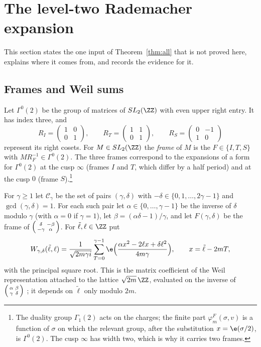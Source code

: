 \section{The level-two Rademacher expansion}\label{sec:hypothesis}

This section states the one input of Theorem~\ref{thm:all} that is not proved here, explains where it comes from, and records the evidence for it.

\subsection{Frames and Weil sums}
Let $\Gamma^0(2)$ be the group of matrices of $SL_2(\ZZ)$ with even upper right entry. It has index three, and
\[
R_I=\begin{pmatrix}1&0\\0&1\end{pmatrix},\qquad R_T=\begin{pmatrix}1&1\\0&1\end{pmatrix},\qquad R_S=\begin{pmatrix}0&-1\\1&0\end{pmatrix}
\]
represent its right cosets. For $M\in SL_2(\ZZ)$ the \emph{frame} of $M$ is the $F\in\{I,T,S\}$ with $MR_F^{-1}\in\Gamma^0(2)$. The three frames correspond to the expansions of a form for $\Gamma^0(2)$ at the cusp $\infty$ (frames $I$ and $T$, which differ by a half period) and at the cusp $0$ (frame $S$).\footnote{The duality group $\Gamma_1(2)$ acts on the charges; the finite part $\varphi^F_m(\sigma,v)$ is a function of $\sigma$ on which the relevant group, after the substitution $x=\e(\sigma/2)$, is $\Gamma^0(2)$. The cusp $\infty$ has width two, which is why it carries two frames.}

For $\gamma\ge1$ let $\mathcal C_\gamma$ be the set of pairs $(\gamma,\delta)$ with $-\delta\in\{0,1,\dots,2\gamma-1\}$ and $\gcd(\gamma,\delta)=1$. For each such pair let $\alpha\in\{0,\dots,\gamma-1\}$ be the inverse of $\delta$ modulo $\gamma$ (with $\alpha=0$ if $\gamma=1$), let $\beta=(\alpha\delta-1)/\gamma$, and let $F(\gamma,\delta)$ be the frame of $\begin{psmallmatrix}\delta&-\beta\\-\gamma&\alpha\end{psmallmatrix}$. For $\tilde\ell,\ell\in\ZZ$ put
\begin{equation}\label{eq:weil}
W_{\gamma,\delta}(\tilde\ell,\ell)=\frac1{\sqrt{2m\gamma i}}\sum_{T=0}^{\gamma-1}\e\Big(\frac{\alpha x^2-2\ell x+\delta\ell^2}{4m\gamma}\Big),\qquad x=\tilde\ell-2mT,
\end{equation}
with the principal square root. This is the matrix coefficient of the Weil representation attached to the lattice $\sqrt{2m}\,\ZZ$, evaluated on the inverse of $\begin{psmallmatrix}\alpha&\beta\\\gamma&\delta\end{psmallmatrix}$ \cite[(2.41)]{CNR21}; it depends on $\tilde\ell$ only modulo $2m$.

